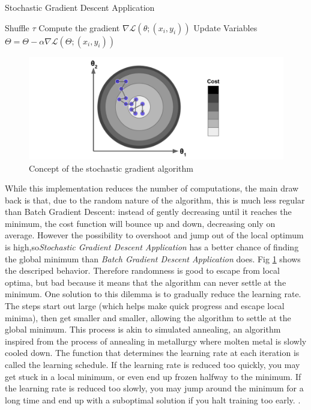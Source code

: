 \documentclass[conference]{IEEEtran}
\begin{document}
\begin{algorithm}
\caption{Stochastic Gradient Descent Application}\label{SGDAal}
\begin{algorithmic}[1]
\State Shuffle $\tau$
\State Compute the gradient $\nabla\mathscr{L}(\theta;(x_i,y_i))$
\State Update Variables $\Theta = \Theta -\alpha\nabla\mathscr{L}(\Theta;(x_i,y_i))$
\EndFor
\EndFor
{}
\end{algorithmic}
\end{algorithm}
\begin{figure}[ht]
    \includegraphics[scale=0.5]{Fig4.png}
    \caption{Concept of the stochastic gradient algorithm}
    \label{fig:st_grad}
\end{figure}
While this implementation reduces the number of computations, the main draw back is that, due to the random nature of the algorithm, this is much less regular than Batch Gradient Descent: instead of gently decreasing until it reaches the minimum, the cost function will bounce up and down, decreasing only on average. However
the possibility to overshoot and jump out of the local optimum is high,so\textit{Stochastic Gradient Descent Application} has a better chance of finding the global minimum than \textit{Batch Gradient Descent Application} does. Fig \ref{fig:st_grad} shows the descriped behavior. 
Therefore randomness is good to escape from local optima, but bad because it means that the algorithm can never settle at the minimum. One solution to this dilemma is to gradually reduce the learning rate. The steps start out large (which helps make quick progress and escape local minima), then get smaller and smaller, allowing the algorithm to settle at the global minimum. This process is akin to simulated annealing, an algorithm inspired from the process of annealing in metallurgy where molten metal is slowly cooled down. The function that determines the learning rate at each iteration is called the learning schedule. If the learning rate is reduced too quickly, you may get stuck in a local minimum, or even end up frozen halfway to the minimum. If the learning rate is reduced too slowly, you may jump around the minimum for a long time and end up with a suboptimal solution if you halt training too early. \cite{Scikit-Learn}.
\end{document}
